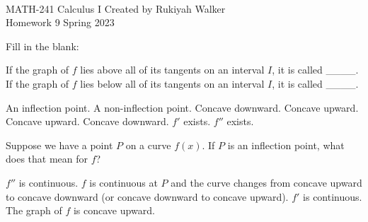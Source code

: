 \documentclass[addpoints, 12pt]{exam}%
\newcommand{\spc}{\vspace*{0.5cm}}
\begin{document}
\noindent \hrulefill \\
	MATH-241 Calculus I \hfill Created by Rukiyah Walker\\
	Homework 9 \hfill Spring 2023\\ \vspace*{-1cm}
 
	\noindent\hrulefill


\begin{questions}

\vspace*{0.5cm}

\question[1]

Fill in the blank: 

If the graph of $f$ lies above all of its tangents on an interval $I$, it is called ____. 
\newline If the graph of $f$ lies below all of its tangents on an interval $I$, it is called ____.

\begin{multicols}{2}
\begin{choices}
\choice An inflection point.
\newline A non-inflection point.
\choice Concave downward.
\newline Concave upward.
\CorrectChoice Concave upward.
\newline Concave downward.
\choice $f'$ exists.
\newline $f''$ exists.
\end{choices}
\end{multicols}

\spc

\question[1]

Suppose we have a point $P$ on a curve $f(x)$. If $P$ is an inflection point, what does that mean for $f$?

\begin{choices}
\choice $f''$ is continuous.
\CorrectChoice $f$ is continuous at $P$ and the curve changes from concave upward to concave downward (or concave downward to concave upward). 
\choice $f'$ is continuous.
\choice The graph of $f$ is concave upward.
\end{choices}


\end{questions}
\end{document}
